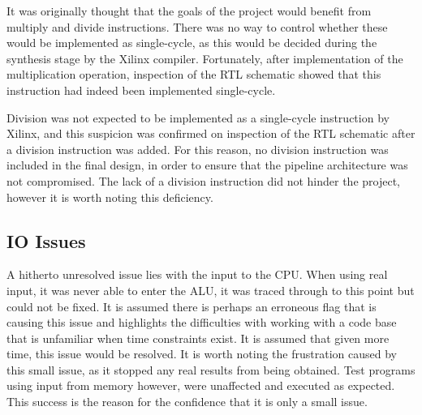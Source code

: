 It was originally thought that the goals of the project would benefit from
multiply and divide instructions. There was no way to control whether these
would be implemented as single-cycle, as this would be decided during the
synthesis stage by the Xilinx compiler. Fortunately, after implementation of the
multiplication operation, inspection of the RTL schematic showed that this
instruction had indeed been implemented single-cycle.

Division was not expected to be implemented as a single-cycle instruction by
Xilinx, and this suspicion was confirmed on inspection of the RTL schematic
after a division instruction was added. For this reason, no division instruction
was included in the final design, in order to ensure that the pipeline
architecture was not compromised. The lack of a division instruction did not
hinder the project, however it is worth noting this deficiency.

\subsection{IO Issues}
A hitherto unresolved issue lies with the input to the CPU. When using real input,
it was never able to enter the ALU, it was traced through to this point but
could not be fixed. It is assumed there is perhaps an erroneous flag that is causing
this issue and highlights the difficulties with working with a code base that is 
unfamiliar when time constraints exist. It is assumed that given more time, this 
issue would be resolved. It is worth noting the frustration caused by this small
issue, as it stopped any real results from being obtained. Test programs using input
from memory however, were unaffected and executed as expected. This success is the 
reason for the confidence that it is only a small issue.
